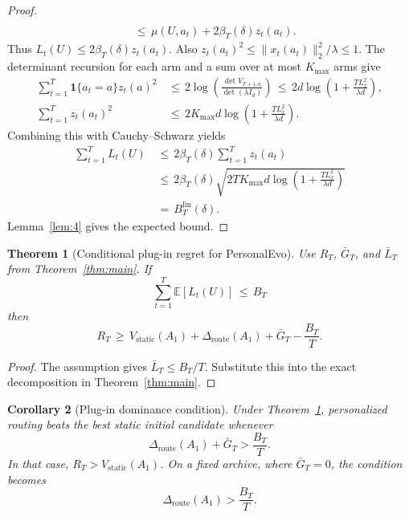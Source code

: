 \documentclass{article} %
\newtheorem{theorem}{Theorem}
\newtheorem{corollary}[theorem]{Corollary}
\begin{document}
\begin{proof}
\begin{equation}
\begin{aligned}
\\
&\,\leq\,
\mu(U,a_t)
+
2\beta_T(\delta)z_t(a_t).
\end{aligned}
\end{equation}
Thus \(L_t(U)\leq2\beta_T(\delta)z_t(a_t)\).  Also
\(z_t(a_t)^2\leq\|x_t(a_t)\|_2^2/\lambda\leq1\).  The determinant recursion
for each arm and a sum over at most \(K_{\max}\) arms give
\begin{equation}
\begin{aligned}
\sum_{t=1}^{T}
\mathbf{1}\{a_t=a\}z_t(a)^2
&\,\leq\,
2
\log\!\left(
\frac{\det V_{T+1,a}}{\det(\lambda I_d)}
\right)
\,\leq\,
2d
\log\!\left(1+\frac{T L_x^2}{\lambda d}\right), \\
\sum_{t=1}^{T}z_t(a_t)^2
&\,\leq\,
2K_{\max}d
\log\!\left(1+\frac{T L_x^2}{\lambda d}\right).
\end{aligned}
\end{equation}
Combining this with Cauchy--Schwarz yields
\begin{equation}
\begin{aligned}
\sum_{t=1}^{T}L_t(U)
&\,\leq\,
2\beta_T(\delta)
\sum_{t=1}^{T}z_t(a_t)
\\
&\,\leq\,
2\beta_T(\delta)
\sqrt{
2T K_{\max}d
\log\!\left(1+\frac{T L_x^2}{\lambda d}\right)
}
\\
&\,=\,
B_T^{\mathrm{lin}}(\delta).
\end{aligned}
\end{equation}
Lemma~\ref{lem:4} gives the expected bound.
\end{proof}

\begin{theorem}[Conditional plug-in regret for PersonalEvo]
\label{thm:convergence}
Use \(R_T\), \(\bar G_T\), and \(\bar L_T\) from
Theorem~\ref{thm:main}.  If
\begin{equation}
\label{eq:app-plugin-tax-assumption}
\sum_{t=1}^{T}\mathbb{E}[L_t(U)]
\,\leq\,
B_T
\end{equation}
then
\begin{equation}
R_T
\,\geq\,
V_{\mathrm{static}}(A_1)
+
\Delta_{\mathrm{route}}(A_1)
+
\bar G_T
-
\frac{B_T}{T}.
\end{equation}
\end{theorem}

\begin{proof}
The assumption gives \(\bar L_T\leq B_T/T\).  Substitute this into the exact
decomposition in Theorem~\ref{thm:main}.
\end{proof}

\begin{corollary}[Plug-in dominance condition]
\label{cor:app-plugin-dominance}
Under Theorem~\ref{thm:convergence}, personalized routing beats the best
static initial candidate whenever
\begin{equation}
\Delta_{\mathrm{route}}(A_1)
+
\bar G_T
>
\frac{B_T}{T}.
\end{equation}
In that case, \(R_T>V_{\mathrm{static}}(A_1)\).  On a fixed archive, where
\(\bar G_T=0\), the condition becomes
\begin{equation}
\Delta_{\mathrm{route}}(A_1)
>
\frac{B_T}{T}.
\end{equation}
\end{corollary}
\end{document}
